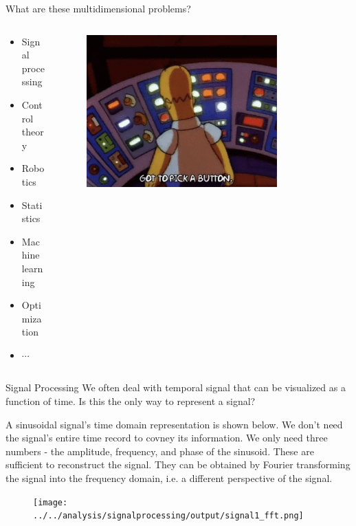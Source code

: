 \documentclass[aspectratio=169]{beamer}
\let\olditem\item
\renewcommand{\item}{\setlength{\itemsep}{\fill}\olditem}
\begin{document}
\begin{frame}{What are these multidimensional problems?}
  \begin{columns}
    \begin{column}{0.3\textwidth}
      \begin{itemize}
        \item Signal processing
        \item Control theory
        \item Robotics
        \item Statistics
        \item Machine learning
        \item Optimization
        \item $\cdots$
      \end{itemize}
    \end{column}
    \begin{column}{0.675\textwidth}
      \begin{figure}
        \centering
        \includegraphics[width=0.8\textwidth]{toomany.png}
      \end{figure}
    \end{column}    
  \end{columns}
\end{frame}


\begin{frame}{Signal Processing}
  We often deal with temporal signal that can be visualized as a function of time. Is this the only way to represent a signal?
  \vspace{0.2cm}

  A sinusoidal signal's time domain representation is shown below. We don't need the signal's entire time record to covney its information. We only need three numbers - the amplitude, frequency, and phase of the sinusoid. These are sufficient to reconstruct the signal. They can be obtained by Fourier transforming the signal into the frequency domain, i.e. a different perspective of the signal.
  \begin{figure}
    \centering
    \texttt{[image: ../../analysis/signalprocessing/output/signal1\_fft.png]}
  \end{figure}
\end{frame}
\end{document}
